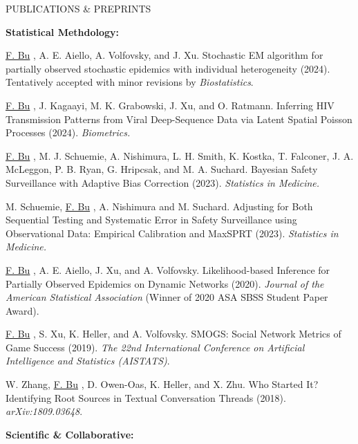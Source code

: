 \documentclass{resume} %
\newcommand{\myName}[1]{
	\underline{#1}
}
\begin{document}
\begin{rSection}{PUBLICATIONS \& PREPRINTS}

\hspace{-.2in} \textbf{Statistical Methdology:}

\myName{F. Bu}, A. E. Aiello, A. Volfovsky, and J. Xu.  
Stochastic EM algorithm for partially observed stochastic epidemics with individual heterogeneity (2024). Tentatively accepted with minor revisions by \emph{Biostatistics}.%

\smallskip

\myName{F. Bu}, J. Kagaayi, M. K. Grabowski, J. Xu, and O. Ratmann.
Inferring HIV Transmission Patterns from Viral Deep-Sequence Data via Latent Spatial Poisson Processes (2024). \emph{Biometrics.} 

\smallskip

\myName{F. Bu}, M. J. Schuemie,  A. Nishimura, L. H. Smith, K. Kostka, T. Falconer, J. A. McLeggon, P. B. Ryan, G. Hripcsak, and M. A. Suchard.
Bayesian Safety Surveillance with Adaptive Bias Correction (2023). \emph{Statistics in Medicine.} %

\smallskip


M. Schuemie, \myName{F. Bu}, A. Nishimura and M. Suchard.
Adjusting for Both Sequential Testing and Systematic Error in Safety Surveillance using Observational Data: Empirical Calibration and MaxSPRT (2023). \emph{Statistics in Medicine.}

\smallskip


\myName{F. Bu}, A. E. Aiello, J. Xu, and A. Volfovsky. 
Likelihood-based Inference for Partially Observed Epidemics on Dynamic Networks (2020). \emph{Journal of the American Statistical Association} (Winner of 2020 ASA SBSS Student Paper Award). %

\smallskip

\myName{F. Bu}, S. Xu, K. Heller, and A. Volfovsky. 
SMOGS: Social Network Metrics of Game Success (2019). \emph{The 22nd International Conference on Artificial Intelligence and Statistics (AISTATS)}. %

\smallskip

W. Zhang, \myName{F. Bu}, D. Owen-Oas, K. Heller, and X. Zhu. 
Who Started It? Identifying Root Sources in Textual Conversation Threads (2018). \emph{arXiv:1809.03648}.

\medskip

\newpage 
\hspace{-.2in} \textbf{Scientific \& Collaborative:}


\end{rSection}
\end{document}
